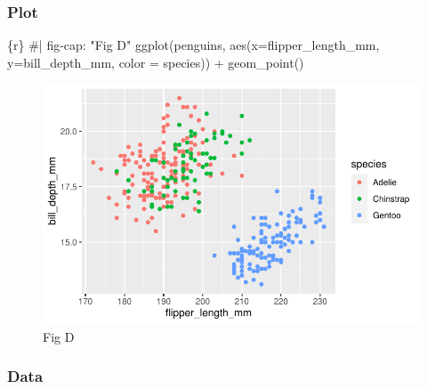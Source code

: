 \documentclass[
  letterpaper,
  DIV=11,
  numbers=noendperiod]{scrreprt}
\newenvironment{Shaded}{\begin{snugshade}}{\end{snugshade}}
\newcommand{\AttributeTok}[1]{\textcolor[rgb]{0.40,0.45,0.13}{#1}}
\newcommand{\CommentTok}[1]{\textcolor[rgb]{0.37,0.37,0.37}{#1}}
\newcommand{\FunctionTok}[1]{\textcolor[rgb]{0.28,0.35,0.67}{#1}}
\newcommand{\InformationTok}[1]{\textcolor[rgb]{0.37,0.37,0.37}{#1}}
\newcommand{\NormalTok}[1]{\textcolor[rgb]{0.00,0.23,0.31}{#1}}
\newcommand{\SpecialCharTok}[1]{\textcolor[rgb]{0.37,0.37,0.37}{#1}}
\begin{document}
\begin{tcolorbox}[enhanced jigsaw, breakable, colback=white, bottomrule=.15mm, leftrule=.75mm, colframe=quarto-callout-note-color-frame, arc=.35mm, rightrule=.15mm, toprule=.15mm, left=2mm, opacityback=0]

\hypertarget{plot-2}{%
\subsubsection*{Plot}\label{plot-2}}

\begin{Shaded}
\begin{Highlighting}[]
\InformationTok{\textasciigrave{}\textasciigrave{}\textasciigrave{}\{r\}}
\CommentTok{\#| fig{-}cap: "Fig D"}
\FunctionTok{ggplot}\NormalTok{(penguins, }\FunctionTok{aes}\NormalTok{(}\AttributeTok{x=}\NormalTok{flipper\_length\_mm, }\AttributeTok{y=}\NormalTok{bill\_depth\_mm, }\AttributeTok{color =}\NormalTok{ species)) }\SpecialCharTok{+}
  \FunctionTok{geom\_point}\NormalTok{()}
\InformationTok{\textasciigrave{}\textasciigrave{}\textasciigrave{}}
\end{Highlighting}
\end{Shaded}

\begin{figure}[H]

{\centering \includegraphics{03-content_files/figure-pdf/unnamed-chunk-10-1.pdf}

}

\caption{Fig D}

\end{figure}

\hypertarget{data-2}{%
\subsubsection*{Data}\label{data-2}}


\end{tcolorbox}
\end{document}
